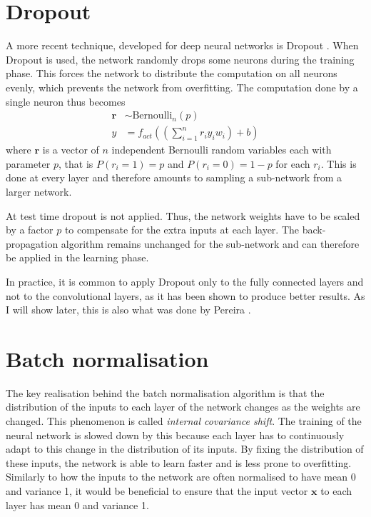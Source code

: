 \documentclass[12pt,a4paper,twoside,openright]{report}
\begin{document}
\chapter{Dropout}
\label{appendix:dropout}
A more recent technique, developed for deep neural networks is Dropout \cite{dropout}. When Dropout is used, the network randomly drops some neurons during the training phase. This forces the network to distribute the computation on all neurons evenly, which prevents the network from overfitting. The computation done by a single neuron thus becomes
\begin{equation}
\begin{split}
	\textbf{r} & \sim \text{Bernoulli}_n(p) \\
	y & = f_{act}((\sum_{i=1}^{n} r_i y_i w_i) + b)
\end{split}
\end{equation}
where $\textbf{r}$ is a vector of $n$ independent Bernoulli random variables each with parameter $p$, that is $P(r_i = 1) = p$ and $P(r_i = 0) = 1 - p$ for each $r_i$. This is done at every layer and therefore amounts to sampling a sub-network from a larger network. 

At test time dropout is not applied. Thus, the network weights have to be scaled by a factor $p$ to compensate for the extra inputs at each layer. The back-propagation algorithm remains unchanged for the sub-network and can therefore be applied in the learning phase.

In practice, it is common to apply Dropout only to the fully connected layers and not to the convolutional layers, as it has been shown to produce better results. As I will show later, this is also what was done by Pereira \cite{pereira}.

\chapter{Batch normalisation}
\label{appendix:batch_normalisation}
The key realisation behind the batch normalisation algorithm \cite{batch_normalization} is that the distribution of the inputs to each layer of the network changes as the weights are changed. This phenomenon is called \textit{internal covariance shift}. The training of the neural network is slowed down by this because each layer has to continuously adapt to this change in the distribution of its inputs. By fixing the distribution of these inputs, the network is able to learn faster and is less prone to overfitting. Similarly to how the inputs to the network are often normalised to have mean 0 and variance 1, it would be beneficial to ensure that the input vector $\textbf{x}$ to each layer has mean 0 and variance 1. 
\end{document}
